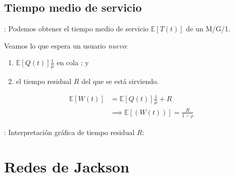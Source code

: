 \documentclass[xcolor={x11names}]{beamer}
\begin{document}
\subsection{Tiempo medio de servicio}
\begin{frame}{\secname: \subsecname}
    Podemos obtener el tiempo medio
    de servicio $\mathbb{E}[T(t)]$ de
    un M/G/1.
    \begin{figure}
        
    \end{figure}
    Veamos lo que espera un usuario
    \emph{nuevo}:
    \begin{enumerate}
        \item $\mathbb{E}[Q(t)]\tfrac{1}{\mu}$
            en cola ; y
        \item el tiempo residual $R$ del que
            se está sirviendo.
    \end{enumerate}
    \begin{align*}
        \mathbb{E}[W(t)]&=
        \mathbb{E}[Q(t)]\tfrac{1}{\mu}
        + R\\
        &\implies \mathbb{E}[(W(t))]=
        \frac{R}{1-\rho}
    \end{align*}
\end{frame}


\begin{frame}{\secname: \subsecname}
    Interpretación gráfica de tiempo
    residual $R$:
    \begin{figure}
        
    \end{figure}
\end{frame}













\section{Redes de Jackson}
\end{document}
